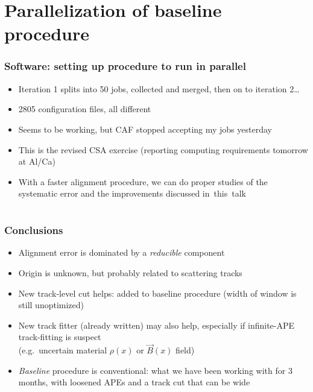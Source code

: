 \documentclass[compress]{beamer}
\begin{document}
\section*{Parallelization of baseline procedure}

\begin{frame}
\frametitle{Software: setting up procedure to run in parallel}
\begin{itemize}\setlength{\itemsep}{0.4 cm}
\item Iteration 1 splits into 50 jobs, collected and merged, then on to iteration 2\ldots

\item 2805 configuration files, all different

\item Seems to be working, but CAF stopped accepting my jobs yesterday

\item This is the revised CSA exercise (reporting computing
requirements tomorrow at Al/Ca)

\item With a faster alignment procedure, we can do proper studies of
the systematic error and the improvements discussed in~this~talk
\end{itemize}
\end{frame}

\section*{}

\begin{frame}
\frametitle{Conclusions}
\begin{itemize}\setlength{\itemsep}{0.5 cm}
\item Alignment error is dominated by a {\it reducible} component

\item Origin is unknown, but probably related to scattering tracks

\item New track-level cut helps: added to baseline procedure (width of
window is still unoptimized)

\item New track fitter (already written) may also help, especially if
infinite-APE track-fitting is suspect \\ (e.g.\ uncertain material
$\rho(x)$ or $\vec{B}(x)$ field)

\item {\it Baseline} procedure is conventional: what we have been working
with for 3 months, with loosened APEs and a track cut that can be wide
\end{itemize}
\label{numpages}
\end{frame}
\end{document}

